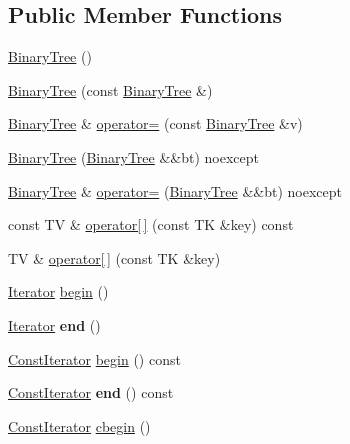 \subsection*{Public Member Functions}
\begin{DoxyCompactItemize}
\item 
\mbox{\hyperlink{classBinaryTree_a18b4981a8d885a296b144462729c0679}{Binary\+Tree}} ()
\item 
\mbox{\hyperlink{classBinaryTree_a8cfb4f89d47accb81042824dca065946}{Binary\+Tree}} (const \mbox{\hyperlink{classBinaryTree}{Binary\+Tree}} \&)
\item 
\mbox{\hyperlink{classBinaryTree}{Binary\+Tree}} \& \mbox{\hyperlink{classBinaryTree_ad954acd76e1ad805b1bc8b7964dd9a58}{operator=}} (const \mbox{\hyperlink{classBinaryTree}{Binary\+Tree}} \&v)
\item 
\mbox{\hyperlink{classBinaryTree_a22a4831494c378f556151e321cdf917b}{Binary\+Tree}} (\mbox{\hyperlink{classBinaryTree}{Binary\+Tree}} \&\&bt) noexcept
\item 
\mbox{\hyperlink{classBinaryTree}{Binary\+Tree}} \& \mbox{\hyperlink{classBinaryTree_a6a3f46892900021d0e7304d762c47af8}{operator=}} (\mbox{\hyperlink{classBinaryTree}{Binary\+Tree}} \&\&bt) noexcept
\item 
const TV \& \mbox{\hyperlink{classBinaryTree_ab5087864bf9bd49c1e5a79640066e34e}{operator\mbox{[}$\,$\mbox{]}}} (const TK \&key) const
\item 
TV \& \mbox{\hyperlink{classBinaryTree_a21bebae9adf0939f622b2bb47540694a}{operator\mbox{[}$\,$\mbox{]}}} (const TK \&key)
\item 
\mbox{\hyperlink{classBinaryTree_1_1Iterator}{Iterator}} \mbox{\hyperlink{classBinaryTree_a828acf65e70cf4b6e106807a052ca508}{begin}} ()
\item 
\mbox{\label{classBinaryTree_af27fde669bad584ff4bc399be81d93b7}} 
\mbox{\hyperlink{classBinaryTree_1_1Iterator}{Iterator}} {\bfseries end} ()
\item 
\mbox{\hyperlink{classBinaryTree_1_1ConstIterator}{Const\+Iterator}} \mbox{\hyperlink{classBinaryTree_aaf9049aa9e91bed50e9543b6db442d80}{begin}} () const
\item 
\mbox{\label{classBinaryTree_ace2351a2760c864d97fd61878cc348a6}} 
\mbox{\hyperlink{classBinaryTree_1_1ConstIterator}{Const\+Iterator}} {\bfseries end} () const
\item 
\mbox{\hyperlink{classBinaryTree_1_1ConstIterator}{Const\+Iterator}} \mbox{\hyperlink{classBinaryTree_afc1bfd2d748acb391605ffcf8c86439d}{cbegin}} ()

\end{DoxyCompactItemize}
